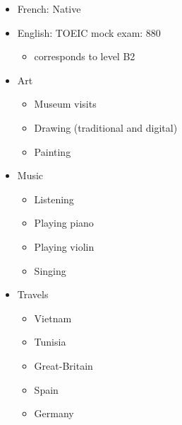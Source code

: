 \documentclass[a4paper,table]{twentysecondcv}
\begin{document}
{  

  \begin{itemize}[leftmargin=1mm]
    \setlength\itemsep{-5pt}
    \item French: Native
    \item English: TOEIC mock exam: 880
      \vspace{-5pt}
    \begin{itemize}
      \setlength\itemsep{-5pt}
      \item corresponds to level B2
    \end{itemize}
  \end{itemize}
  \begin{flushleft}
  \begin{itemize}[leftmargin=1mm]
    \setlength\itemsep{-5pt}
    \item Art
    \vspace{-5pt}
    \begin{itemize}
      \item Museum visits
      \item Drawing (traditional and digital)
      \item Painting
    \end{itemize}
    \item Music
    \vspace{-5pt}
    \begin{itemize}
      \setlength\itemsep{-5pt}
      \item Listening
      \item Playing piano
      \item Playing violin
      \item Singing
    \end{itemize}
    \item Travels
    \vspace{-5pt}
    \begin{itemize}
      \setlength\itemsep{-5pt}
      \item Vietnam
      \item Tunisia
      \item Great-Britain
      \item Spain
      \item Germany
    \end{itemize}
  \end{itemize}
  \end{flushleft}
}

\makeprofile{}

\vspace{-0.1cm}
\begin{center}
\end{center}
\vspace{-0.1cm}
\end{document}
